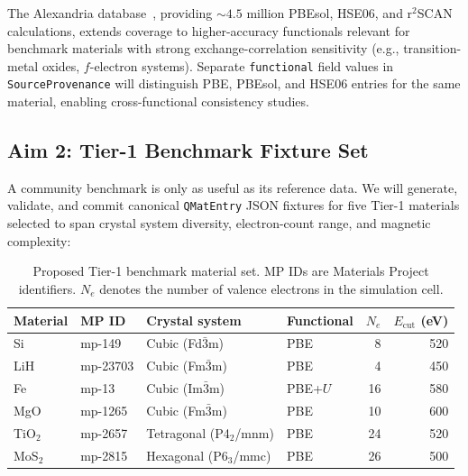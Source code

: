 \documentclass[11pt]{article}
\newcommand{\Ecut}{E_{\mathrm{cut}}{}}
\begin{document}
The Alexandria database~\cite{Schmidt2022}, providing $\sim 4.5$ million
PBEsol, HSE06, and r$^2$SCAN calculations, extends coverage to
higher-accuracy functionals relevant for benchmark materials with strong
exchange-correlation sensitivity (e.g., transition-metal oxides, $f$-electron
systems).
Separate \texttt{functional} field values in \texttt{SourceProvenance}
will distinguish PBE, PBEsol, and HSE06 entries for the same material,
enabling cross-functional consistency studies.

\subsection{Aim 2: Tier-1 Benchmark Fixture Set}

A community benchmark is only as useful as its reference data.
We will generate, validate, and commit canonical \texttt{QMatEntry} JSON
fixtures for five Tier-1 materials selected to span crystal system diversity,
electron-count range, and magnetic complexity:

\begin{table}[h!]
\centering
\caption{Proposed Tier-1 benchmark material set.
MP IDs are Materials Project identifiers.
$N_e$ denotes the number of valence electrons in the simulation cell.}
\label{tab:tier1}
\small
\begin{tabular}{llllrr}
\toprule
Material & MP ID & Crystal system & Functional & $N_e$ & $\Ecut$ (eV)\\
\midrule
Si        & mp-149   & Cubic (Fd$\bar{3}$m)        & PBE       & 8  & 520\\
LiH       & mp-23703 & Cubic (Fm$\bar{3}$m)        & PBE       & 4  & 450\\
Fe        & mp-13    & Cubic (Im$\bar{3}$m)         & PBE+$U$   & 16 & 580\\
MgO       & mp-1265  & Cubic (Fm$\bar{3}$m)         & PBE       & 10 & 600\\
TiO$_2$   & mp-2657  & Tetragonal (P4$_2$/mnm)      & PBE       & 24 & 520\\
MoS$_2$   & mp-2815  & Hexagonal (P6$_3$/mmc)       & PBE       & 26 & 500\\
\bottomrule
\end{tabular}
\end{table}
\end{document}
